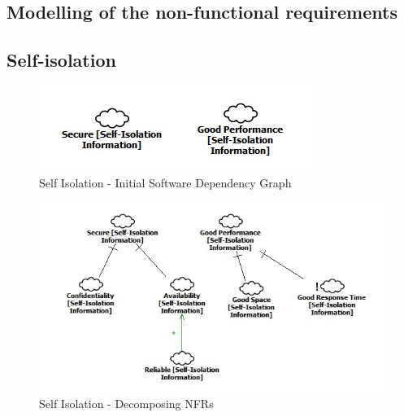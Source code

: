 \documentclass{VUMIFPSkursinis}
\begin{document}
	\begin{landscape}
\section{Modelling of the non-functional requirements}
	\subsection{Self-isolation}
		\begin{figure}[H]
			\center
			\includegraphics[scale=0.9]{StarUML/Self-Isolation-1}
			\caption{Self Isolation - Initial Software Dependency Graph} %
			\label{img:kurimoProcesas}
		\end{figure}
		\begin{figure}[H]
			\center
			\includegraphics[scale=0.5]{StarUML/Self-Isolation-2}
			\caption{Self Isolation - Decomposing NFRs} %
			\label{img:kurimoProcesas}
		\end{figure}
		


\end{landscape}
\end{document}
